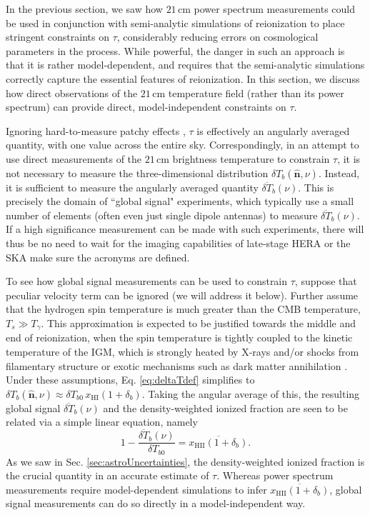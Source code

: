 \documentclass[twocolumn,aps,prd,nofootinbib,showpacs]{revtex4-1}
\begin{document}
In the previous section, we saw how $21\,\textrm{cm}$ power spectrum measurements could be used in conjunction with semi-analytic simulations of reionization to place stringent constraints on $\tau$, considerably reducing errors on cosmological parameters in the process. While powerful, the danger in such an approach is that it is rather model-dependent, and requires that the semi-analytic simulations correctly capture the essential features of reionization. In this section, we discuss how direct observations of the $21\,\textrm{cm}$ temperature field (rather than its power spectrum) can provide direct, model-independent constraints on $\tau$.

Ignoring hard-to-measure patchy effects \cite{dvorkin_et_al2009,su_et_al2011}, $\tau$ is effectively an angularly averaged quantity, with one value across the entire sky. Correspondingly, in an attempt to use direct measurements of the $21\,\textrm{cm}$ brightness temperature to constrain $\tau$, it is not necessary to measure the three-dimensional distribution $\delta T_b (\mathbf{\hat{n}}, \nu)$. Instead, it is sufficient to measure the angularly averaged quantity $\overline{\delta T}_b (\nu)$. This is precisely the domain of ``global signal" experiments, which typically use a small number of elements (often even just single dipole antennas) to measure $\overline{\delta T}_b (\nu)$. If a high significance measurement can be made with such experiments, there will thus be no need to wait for the imaging capabilities of late-stage HERA or the SKA \acl{make sure the acronyms are defined}.

To see how global signal measurements can be used to constrain $\tau$, suppose that peculiar velocity term can be ignored (we will address it below). Further assume that the hydrogen spin temperature is much greater than the CMB temperature, $T_s \gg T_\gamma$. This approximation is expected to be justified towards the middle and end of reionization, when the spin temperature is tightly coupled to the kinetic temperature of the IGM, which is strongly heated by X-rays and/or shocks from filamentary structure or exotic mechanisms such as dark matter annihilation \cite{gnedin_and_shaver2004,pritchard_et_al2010,mirabel_et_al2011,valdes_et_al2013,evoli_et_al2014}. Under these assumptions, Eq. \eqref{eq:deltaTdef} simplifies to $\delta T_b(\mathbf{\hat{n}}, \nu) \approx \delta T_{b0}\, x_\textrm{HI}  (1 + \delta_b)$. Taking the angular average of this, the resulting global signal $\overline{\delta T}_b (\nu)$ and the density-weighted ionized fraction are seen to be related via a simple linear equation, namely
\begin{equation}
\label{eq:globalSigDirect}
1- \frac{\overline{\delta T}_b (\nu)}{\delta T_{b0}} = \overline{x_\textrm{HII} (1+\delta_b)}.
\end{equation}
As we saw in Sec. \ref{sec:astroUncertainties}, the density-weighted ionized fraction is the crucial quantity in an accurate estimate of $\tau$. Whereas power spectrum measurements require model-dependent simulations to infer $\overline{x_\textrm{HII} (1+\delta_b)}$, global signal measurements can do so directly in a model-independent way.
\end{document}
